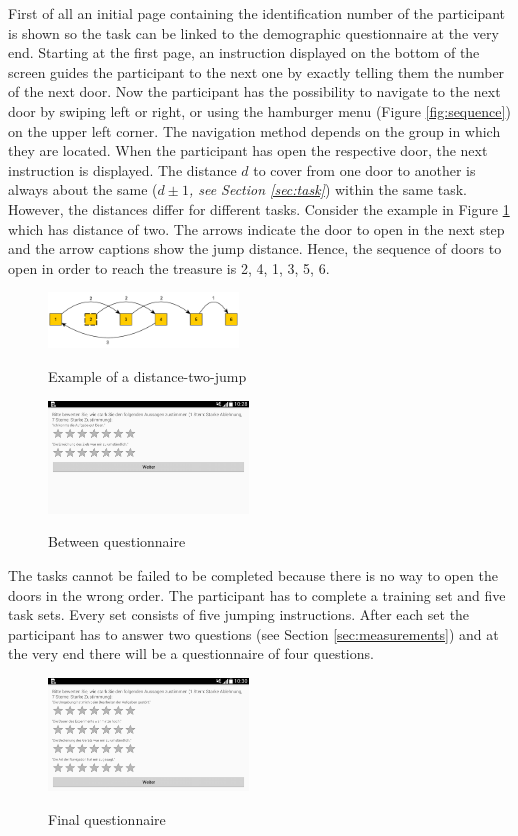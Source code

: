 \documentclass{sig-alternate-05-2015}
\begin{document}
First of all an initial page containing the identification number of the participant is shown so the task can be linked to the demographic questionnaire at the very end. Starting at the first page, an instruction displayed on the bottom of the screen guides the participant to the next one by exactly telling them the number of the next door. Now the participant has the possibility to navigate to the next door by swiping left or right, or using the hamburger menu (Figure \ref{fig:sequence}) on the upper left corner. The navigation method depends on the group in which they are located. When the participant has open the respective door, the next instruction is displayed. The distance $d$ to cover from one door to another is always about the same ($d \pm 1$\textit{, see Section \ref{sec:task}}) within the same task. However, the distances differ for different tasks. Consider the example in Figure \ref{fig:jump} which has distance of two. The arrows indicate the door to open in the next step and the arrow captions show the jump distance. Hence, the sequence of doors to open in order to reach the treasure is 2, 4, 1, 3, 5, 6.
\begin{figure}
	\centering
	\includegraphics[width=0.45\textwidth]{pics/jump}
	\label{fig:jump}
	\caption{Example of a distance-two-jump}
\end{figure}
\begin{figure}
	\centering
	\includegraphics[width=0.475\textwidth]{pics/screenshots/global3-cut}
	\label{fig:between_questionnaire}
	\caption{Between questionnaire}
\end{figure}
The tasks cannot be failed to be completed because there is no way to open the doors in the wrong order. The participant has to complete a training set and five task sets. Every set consists of five jumping instructions. After each set the participant has to answer two questions (see Section \ref{sec:measurements}) and at the very end there will be a questionnaire of four questions.
\begin{figure}
	\centering
	\includegraphics[width=0.475\textwidth]{pics/screenshots/global5-cut}
	\label{fig:final_questionnaire}
	\caption{Final questionnaire}
\end{figure}
\end{document}
